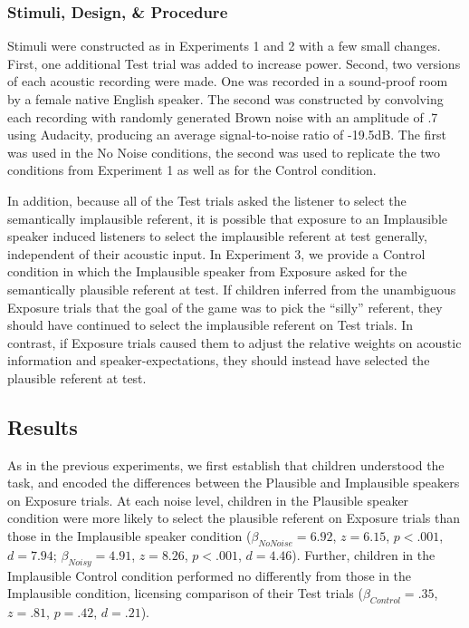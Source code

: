 \documentclass[man,floatsintext]{apa6}
\begin{document}
\subsubsection{Stimuli, Design, \& Procedure}

Stimuli were constructed as in Experiments 1 and 2 with a few small changes. First, one additional Test trial was added to increase power. Second, two versions of each acoustic recording were made. One was recorded in a sound-proof room by a female native English speaker. The second was constructed by convolving each recording with randomly generated Brown noise with an amplitude of .7 using Audacity, producing an average signal-to-noise ratio of -19.5dB. The first was used in the No Noise conditions, the second was used to replicate the two conditions from Experiment 1 as well as for the Control condition.

In addition, because all of the Test trials asked the listener to select the semantically implausible referent, it is possible that exposure to an Implausible speaker induced listeners to select the implausible referent at test generally, independent of their acoustic input.  In Experiment 3, we provide a Control condition in which the Implausible speaker from Exposure asked for the semantically plausible referent at test. If children inferred from the unambiguous Exposure trials that the goal of the game was to pick the ``silly'' referent, they should have continued to select the implausible referent on Test trials. In contrast, if Exposure trials caused them to adjust the relative weights on acoustic information and speaker-expectations, they should instead have selected the plausible referent at test.

\subsection{Results}

As in the previous experiments, we first establish that children understood the task, and encoded the differences between the Plausible and Implausible speakers on Exposure trials. At each noise level, children in the Plausible speaker condition were more likely to select the plausible referent on Exposure trials than those in the Implausible speaker condition ($\beta_{No Noise} = 6.92$, $z =6.15$, $p < .001$, $d = 7.94$; $\beta_{Noisy} = 4.91$, $z =8.26$, $p < .001$, $d = 4.46$). Further, children in the Implausible Control condition performed no differently from those in the Implausible condition, licensing comparison of their Test trials ($\beta_{Control} = .35$, $z =.81$, $p = .42$, $d = .21$).
\end{document}
